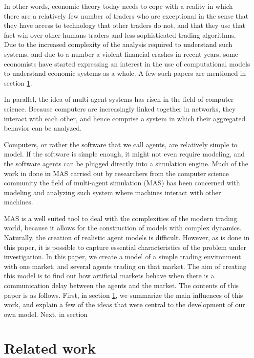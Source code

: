 \documentclass{article}
\begin{document}
In other words, economic theory today needs to cope with a reality in which there are a relatively few number of traders who are exceptional in the sense that they have access to technology that other traders do not, and that they use that fact win over other humans traders and less sophisticated trading algorithms. Due to the increased complexity of the analysis required to understand such systems, and due to a number a violent financial crashes in recent years, some economists have started expressing an interest in the use of computational models to understand economic systems as a whole. A few such papers are mentioned in section \ref{section_relatedWork}.

In parallel, the idea of multi-agent systems has risen in the field of computer science. Because computers are increasingly linked together in networks, they interact with each other, and hence comprise a system in which their aggregated behavior can be analyzed. 

Computers, or rather the software that we call agents, are relatively simple to model. If the software is simple enough, it might not even require modeling, and the software agents can be plugged directly into a simulation engine. Much of the work in done in MAS carried out by researchers from the computer science community the field of multi-agent simulation (MAS) has been concerned with modeling and analyzing such system where machines interact with other machines. 
 
MAS is a well suited tool to deal with the complexities of the modern trading world, because it allows for the construction of models with complex dynamics. Naturally, the creation of realistic agent models is difficult. However, as is done in this paper, it is possible to capture essential characteristics of the problem under investigation. In this paper, we create a model of a simple trading environment with one market, and several agents trading on that market. The aim of creating this model is to find out how artificial markets behave when there is a communication delay between the agents and the market. The contents of this paper is as follows. First, in section \ref{section_relatedWork}, we summarize the main influences of this work, and explain a few of the ideas that were central to the development of our own model. Next, in section 

\section{Related work}\label{section_relatedWork}
\end{document}
